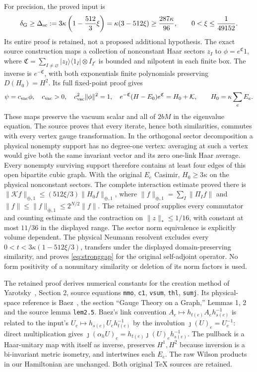 \documentclass[11pt]{article}
\begin{document}
For precision, the proved input is
\begin{equation}\label{eq:stronggap}
 \delta_{\rm G}\geq\Delta_{\rm sc}
 :=3\kappa\left(1-\frac{512}{3}\xi\right)
 =\kappa(3-512\xi)\geq\frac{287\kappa}{96},
 \qquad 0<\xi\leq\frac1{49152}.
\end{equation}
Its entire proof is retained, not a proposed additional hypothesis.
The exact source construction maps a collection of nonconstant
Haar sectors $z_I$ to $\phi=e^{\mathfrak C}1$, where
$\mathfrak C=\sum_{I\ne\varnothing}|z_I\rangle\langle1_I|
\otimes I_{I^c}$ is bounded and nilpotent in each finite box.
The inverse is $e^{-\mathfrak C}$, with both exponentials finite
polynomials preserving $D(H_0)=H^2$. Its full fixed-point proof gives
\[
 \psi=c_{\rm vac}\phi,\quad
 c_{\rm vac}>0,\quad c_{\rm vac}^2\|\phi\|^2=1,\quad
 e^{-\mathfrak C}(H-E_0)e^{\mathfrak C}=H_0+\mathcal K,
 \qquad H_0=\kappa\sum_eE_e.
\]
These maps preserve the vacuum scalar and all of $2bM$ in the
eigenvalue equation. The source proves that every iterate, hence both
similarities, commutes with every vertex gauge transformation.
In the orthogonal sector decomposition a physical nonempty support
has no degree-one vertex: averaging at such a vertex would give both
the same invariant vector and its zero one-link Haar average.
Every nonempty surviving support therefore contains at least four
edges of this open bipartite cubic graph. With the original
$E_e$ Casimir, $H_0\geq3\kappa$ on the physical nonconstant sectors.
The complete interaction estimate proved there is
$\|\mathcal K f\|_{\oplus,1}\leq(512\xi/3)\|H_0f\|_{\oplus,1}$,
where $\|f\|_{\oplus,1}=\sum_I\|\Pi_If\|$ and
$\|f\|\leq\|f\|_{\oplus,1}\leq2^{N/2}\|f\|$.
The retained proof supplies every commutator and counting estimate
and the contraction on $\|z\|_*\leq1/16$, with constant at most
$11/36$ in the displayed range. The sector norm equivalence is
explicitly volume dependent. The physical Neumann resolvent excludes
every $0<t<3\kappa(1-512\xi/3)$, transfers under the displayed
domain-preserving similarity, and proves \eqref{eq:stronggap} for the
original self-adjoint operator. No form positivity of a nonunitary
similarity or deletion of its norm factors is used.

The retained proof derives numerical constants for the creation method
of Yarotsky~\cite{Yarotsky}, Section 2, source equations
\texttt{mmo}, \texttt{c1}, \texttt{vsum}, \texttt{thl},
\texttt{sumj}. Its physical-space reference is Baez~\cite{Baez},
the section ``Gauge Theory on a Graph,'' Lemmas 1, 2 and the source
lemma \texttt{lem2.5}. Baez's link convention
$A_e\mapsto h_{t(e)}A_eh_{s(e)}^{-1}$ is related to the input's
$U_e\mapsto h_{s(e)}U_eh_{t(e)}^{-1}$ by the involution
$\jmath(U)_e=U_e^{-1}$: direct multiplication gives
$\jmath(\alpha_hU)_e=h_{t(e)}\jmath(U)_eh_{s(e)}^{-1}$.
The pullback is a Haar-unitary map with itself as inverse,
preserves $H^1,H^2$ because inversion is a bi-invariant metric
isometry, and intertwines each $E_e$. The raw Wilson products in
our Hamiltonian are unchanged. Both original TeX sources are retained.
\end{document}
